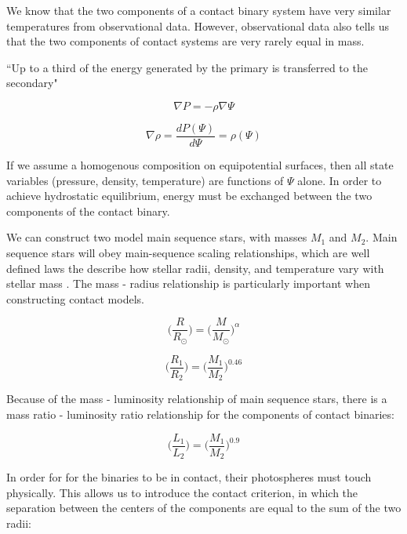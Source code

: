 \documentclass[12pt]{article} %
\numberwithin{equation}{section} %
\begin{document}
We know that the two components of a contact binary system have very similar temperatures from observational data. However, observational data also tells us that the two components of contact systems are very rarely equal in mass.

``Up to a third of the energy generated by the primary is transferred to the secondary"\citep{mochnacki1981contact}

\begin{equation} \label{eqn: equilibrium1}
\nabla P = - \rho \nabla \Psi
\end{equation}

\begin{equation} \label{eqn: equilibrium2}
\nabla \rho = \frac{dP(\Psi)}{d\Psi} = \rho(\Psi)
\end{equation}

If we assume a homogenous composition on equipotential surfaces, then all state variables (pressure, density, temperature) are functions of $\Psi$ alone. In order to achieve hydrostatic equilibrium, energy must be exchanged between the two components of the contact binary.

We can construct two model main sequence stars, with masses $M_{1}$ and $M_{2}$. Main sequence stars will obey main-sequence scaling relationships, which are well defined laws the describe how stellar radii, density, and temperature vary with stellar mass \citep{kippenhahn1990stellar}. The mass - radius relationship is particularly important when constructing contact models. 

\begin{equation} \label{eqn: mass_radius}
 \bigg( \frac{R}{R_{\odot}} \bigg) = \bigg( \frac{M}{M_{\odot}} \bigg)^{\alpha}
\end{equation}

\begin{equation} \label{eqn: roche_mass_radius}
\bigg( \frac{R_{1}}{R_{2}} \bigg) = \bigg( \frac{M_{1}}{M_{2}} \bigg)^{0.46}
\end{equation}

Because of the mass - luminosity relationship of main sequence stars, there is a mass ratio - luminosity ratio relationship for the components of contact binaries: 

\begin{equation} \label{eqn: luminosity_radius}
\bigg( \frac{L_{1}}{L_{2}} \bigg) = \bigg( \frac{M_{1}}{M_{2}} \bigg)^{0.9}
\end{equation}


In order for for the binaries to be in contact, their photospheres must touch physically. This allows us to introduce the contact criterion, in which the separation between the centers of the components are equal to the sum of the two radii:
\end{document}
